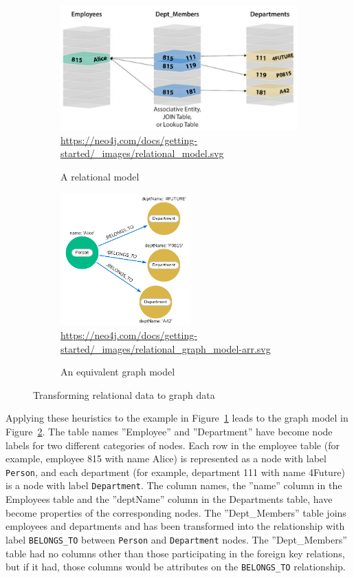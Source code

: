 \begin{figure}
\centering
\begin{subfigure}{\textwidth}
    \centering
    \includegraphics[width=.75\textwidth]{screen9.png} \\
    
    \scriptsize{\url{https://neo4j.com/docs/getting-started/_images/relational_model.svg}}
    \caption{A relational model}
    \label{fig:relationalgraph1}
\end{subfigure}
\hfill
\begin{subfigure}{\textwidth}
\centering
\includegraphics[height=2in]{screen10.png} \\

\scriptsize{\url{https://neo4j.com/docs/getting-started/_images/relational_graph_model-arr.svg}}
    \caption{An equivalent graph model}
    \label{fig:relationalgraph2}
\end{subfigure}
\hfill
\caption{Transforming relational data to graph data}
\label{fig:relationalgraph}
\end{figure}

Applying these heuristics to the example in Figure~\ref{fig:relationalgraph1} leads to the graph model in Figure~\ref{fig:relationalgraph2}. The table names ''Employee'' and ''Department'' have become node labels for two different categories of nodes. Each row in the employee table (for example, employee 815 with name Alice) is represented as a node with label \texttt{Person}, and each department (for example, department 111 with name 4Future) is a node with label \texttt{Department}. The column names, the ''name'' column in the Employees table and the ''deptName'' column in the Departments table, have become properties of the corresponding nodes. The ''Dept\_Members'' table joins employees and departments and has been transformed into the relationship with label \texttt{BELONGS\_TO} between \texttt{Person} and \texttt{Department} nodes. The ''Dept\_Members'' table had no columns other than those participating in the foreign key relations, but if it had, those columns would be attributes on the \texttt{BELONGS\_TO} relationship.

